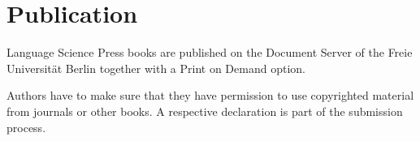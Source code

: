\chapter{Publication}
\label{chap-publication}
\label{sec-license}

Language Science Press books are published on the Document Server of the Freie Universität Berlin
together with a Print on Demand option.



Authors have to make sure that they have permission to use copyrighted material from journals or
other books. A respective declaration is part of the submission process.



